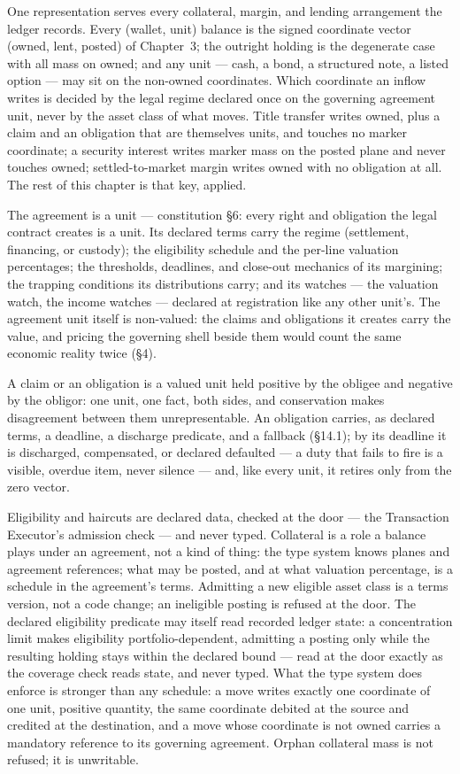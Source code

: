 \documentclass[11pt,a4paper]{article}
\begin{document}
One representation serves every collateral, margin, and lending arrangement the
ledger records. Every (wallet, unit) balance is the signed coordinate vector
(owned, lent, posted) of Chapter~3; the outright holding is the degenerate case
with all mass on owned; and any unit --- cash, a bond, a structured note, a
listed option --- may sit on the non-owned coordinates. Which coordinate an
inflow writes is decided by the legal regime declared once on the governing
agreement unit, never by the asset class of what moves. Title transfer writes
owned, plus a claim and an obligation that are themselves units, and touches no
marker coordinate; a security interest writes marker mass on the posted plane
and never touches owned; settled-to-market margin writes owned with no
obligation at all. The rest of this chapter is that key, applied.

The agreement is a unit --- constitution \S6: every right and obligation the
legal contract creates is a unit. Its declared terms carry the regime
(settlement, financing, or custody); the eligibility schedule and the per-line
valuation percentages; the thresholds, deadlines, and close-out mechanics of
its margining; the trapping conditions its distributions carry; and its
watches --- the valuation watch, the income watches --- declared at
registration like any other unit's. The agreement unit itself is non-valued:
the claims and obligations it creates carry the value, and pricing the
governing shell beside them would count the same economic reality twice
(\S4).

A claim or an obligation is a valued unit held positive by the obligee and
negative by the obligor: one unit, one fact, both sides, and conservation makes
disagreement between them unrepresentable. An obligation carries, as declared
terms, a deadline, a discharge predicate, and a fallback (\S14.1); by its
deadline it is discharged, compensated, or declared defaulted --- a duty that
fails to fire is a visible, overdue item, never silence --- and, like every
unit, it retires only from the zero vector.

Eligibility and haircuts are declared data, checked at the door --- the
Transaction Executor's admission check --- and never typed. Collateral is a
role a balance plays under an agreement, not a kind of thing: the type system
knows planes and agreement references; what may be posted, and at what
valuation percentage, is a schedule in the agreement's terms. Admitting a new
eligible asset class is a terms version, not a code change; an ineligible
posting is refused at the door. The declared eligibility predicate may itself read
recorded ledger state: a concentration limit makes eligibility portfolio-dependent,
admitting a posting only while the resulting holding stays within the declared bound
--- read at the door exactly as the coverage check reads state, and never typed. What
the type system does enforce is stronger
than any schedule: a move writes exactly one coordinate of one unit, positive
quantity, the same coordinate debited at the source and credited at the
destination, and a move whose coordinate is not owned carries a mandatory
reference to its governing agreement. Orphan collateral mass is not refused;
it is unwritable.
\end{document}
